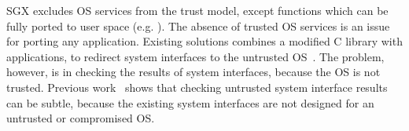 SGX excludes OS services from the trust model, except functions which can be fully ported to user space (e.g. ).
The absence of trusted OS services is an issue for porting any application.
Existing solutions combines a modified C library with applications, to redirect system interfaces
to the untrusted OS~\cite{osdi16scone,shinde17panoply}.
The problem, however, is in checking the results of system interfaces, because the OS is not trusted. %
Previous work~\cite{checkoway13iago} shows that
checking untrusted system interface results can be subtle, because the existing system interfaces are not designed for an untrusted or compromised OS.



